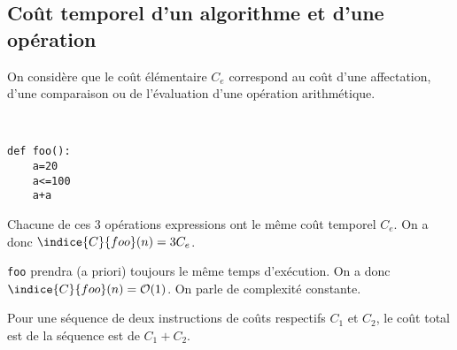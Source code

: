 %

\subsection{Coût temporel d'un algorithme et d'une opération}

\begin{resultat}
On considère que le coût élémentaire $C_e$ correspond au coût d'une affectation, d'une comparaison ou de l'évaluation d'une opération arithmétique. 
\end{resultat}

\begin{exemple}~\\ \vspace{-.3cm}
\noindent\begin{minipage}[c]{.47\linewidth}
\begin{lstlisting} 
def foo():
    a=20
    a<=100
    a+a
\end{lstlisting}
\end{minipage}\hfill
\begin{minipage}[c]{.47\linewidth}
Chacune de ces 3 opérations expressions ont le même coût temporel $C_e$.
On a donc $\indice{C}{foo}(n) = 3 C_e$.

\texttt{foo} prendra (a priori) toujours le même temps d'exécution. On a donc $\indice{C}{foo}(n) = \mathcal{O}(1)$. On parle de complexité constante. 
\end{minipage}
\end{exemple}


\begin{resultat}
Pour une séquence de deux instructions de coûts respectifs $C_1$ et $C_2$, le coût total est de la séquence est de $C_1 + C_2$.
\end{resultat}

